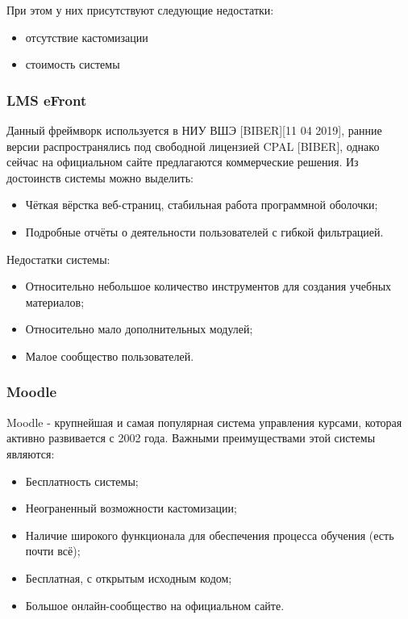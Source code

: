 \documentclass[a4paper,14pt]{article}
\begin{document}
При этом у них присутствуют следующие недостатки:
\begin{itemize}
	\item отсутствие кастомизации
	\item стоимость системы
\end{itemize} 

\subsubsection{LMS eFront}

Данный фреймворк используется в НИУ ВШЭ [BIBER][11 04 2019], ранние версии распространялись под свободной лицензией CPAL [BIBER], однако сейчас на официальном сайте предлагаются коммерческие решения.
Из достоинств системы можно выделить:

\begin{itemize}
	\item Чёткая вёрстка веб-страниц, стабильная работа программной оболочки;
	\item Подробные отчёты о деятельности пользователей с гибкой фильтрацией.	
\end{itemize} 

Недостатки системы:

\begin{itemize}
	\item Относительно небольшое количество инструментов для создания учебных материалов;
	\item Относительно мало дополнительных модулей;
	\item Малое сообщество пользователей.
\end{itemize} 

\subsubsection{Moodle}

Moodle - крупнейшая и самая популярная система управления курсами, которая активно развивается с 2002 года.
Важными преимуществами этой системы являются:

\begin{itemize}
	\item Бесплатность системы;
	\item Неограненный возможности кастомизации;
	\item Наличие широкого функционала для обеспечения процесса обучения (есть почти всё);
	\item Бесплатная, с открытым исходным кодом;
	\item Большое онлайн-сообщество на официальном сайте.
\end{itemize} 
\end{document}
